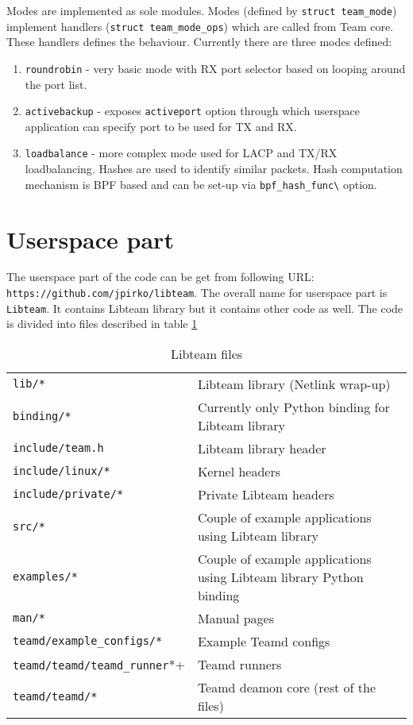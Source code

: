 \documentclass[11pt,a4paper]{article}
\begin{document}
Modes are implemented as sole modules. Modes (defined by \verb+struct team_mode+) implement handlers (\verb+struct team_mode_ops+) which are called from Team core. These handlers defines the behaviour. Currently there are three modes defined:

\begin{enumerate}
\item \verb+roundrobin+ - very basic mode with RX port selector based on looping around the port list.
\item \verb+activebackup+ - exposes \verb+activeport+ option through which userspace application can specify port to be used for TX and RX.
\item \verb+loadbalance+ - more complex mode used for LACP and TX/RX loadbalancing. Hashes are used to identify similar packets. Hash computation mechanism is BPF based and can be set-up via \verb+bpf_hash_func\+ option.
\end{enumerate}

\section{Userspace part}

The userspace part of the code can be get from following URL: \verb+https://github.com/jpirko/libteam+. The overall name for userspace part is \verb+Libteam+. It contains Libteam library but it contains other code as well. The code is divided into files described in table \ref{table2}

\begin{table}[ht]
  \begin{tabular}{ l l }
    \verb+lib/*+ & Libteam library (Netlink wrap-up)  \\
    \verb+binding/*+ & Currently only Python binding for Libteam library \\
    \verb+include/team.h+ & Libteam library header \\
    \verb+include/linux/*+ & Kernel headers \\
    \verb+include/private/*+ & Private Libteam headers \\
    \verb+src/*+ & Couple of example applications using Libteam library \\
    \verb+examples/*+ & Couple of example applications using Libteam library Python binding \\
    \verb+man/*+ & Manual pages \\
    \verb+teamd/example_configs/*+ & Example Teamd configs \\
    \verb+teamd/teamd/teamd_runner+*+ & Teamd runners \\
    \verb+teamd/teamd/*+ & Teamd deamon core (rest of the files) \\
  \end{tabular}
  \caption{Libteam files}
  \label{table2}
\end{table}
\end{document}
